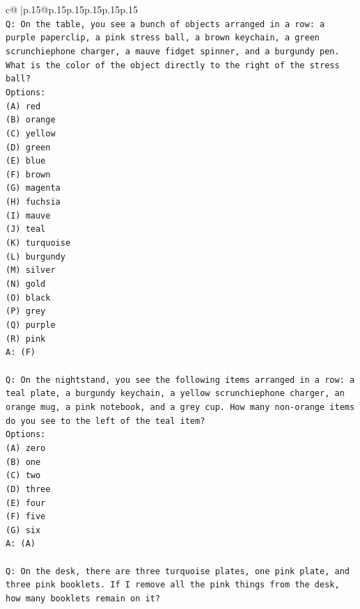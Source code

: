 \documentclass{article}
\begin{document}
{\begin{supertabular}{c@{$\;$}|p{.15\linewidth}@{}p{.15\linewidth}p{.15\linewidth}p{.15\linewidth}p{.15\linewidth}p{.15\linewidth}}
{{{\\ 
\texttt{Q: On the table, you see a bunch of objects arranged in a row: a purple paperclip, a pink stress ball, a brown keychain, a green scrunchiephone charger, a mauve fidget spinner, and a burgundy pen. What is the color of the object directly to the right of the stress ball?} \\
\texttt{Options:} \\
\texttt{(A) red} \\
\texttt{(B) orange} \\
\texttt{(C) yellow} \\
\texttt{(D) green} \\
\texttt{(E) blue} \\
\texttt{(F) brown} \\
\texttt{(G) magenta} \\
\texttt{(H) fuchsia} \\
\texttt{(I) mauve} \\
\texttt{(J) teal} \\
\texttt{(K) turquoise} \\
\texttt{(L) burgundy} \\
\texttt{(M) silver} \\
\texttt{(N) gold} \\
\texttt{(O) black} \\
\texttt{(P) grey} \\
\texttt{(Q) purple} \\
\texttt{(R) pink} \\
\texttt{A: (F)} \\
\\ 
\texttt{Q: On the nightstand, you see the following items arranged in a row: a teal plate, a burgundy keychain, a yellow scrunchiephone charger, an orange mug, a pink notebook, and a grey cup. How many non{-}orange items do you see to the left of the teal item?} \\
\texttt{Options:} \\
\texttt{(A) zero} \\
\texttt{(B) one} \\
\texttt{(C) two} \\
\texttt{(D) three} \\
\texttt{(E) four} \\
\texttt{(F) five} \\
\texttt{(G) six} \\
\texttt{A: (A)} \\
\\ 
\texttt{Q: On the desk, there are three turquoise plates, one pink plate, and three pink booklets. If I remove all the pink things from the desk, how many booklets remain on it?} \\
}}}
\end{supertabular}}
\end{document}

